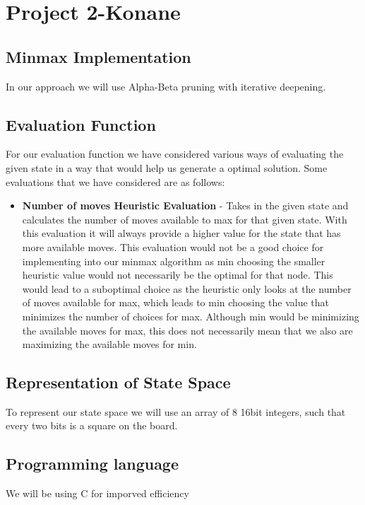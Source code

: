 \documentclass[12pt]{article}
\begin{document}
\section*{Project 2-Konane}

\subsection*{Minmax Implementation}
In our approach we will use Alpha-Beta pruning with iterative deepening.

\subsection*{Evaluation Function}
For our evaluation function we have considered various ways of evaluating the given state in a way that would help us generate a optimal solution. Some evaluations that we have considered are as follows:
\begin{itemize}
\item \textbf{Number of moves Heuristic Evaluation} - 
Takes in the given state and calculates the number of moves available to max for that given state. 
With this evaluation it will always provide a higher value for the state that has more available moves. 
This evaluation would not be a good choice for implementing into our minmax algorithm as min choosing the smaller heuristic value would not necessarily be the optimal for that node. 
This would lead to a suboptimal choice as the heuristic only looks at the number of moves available for max, which leads to min choosing the value that minimizes the number of choices for max. 
Although min would be minimizing the available moves for max, this does not necessarily mean that we also are maximizing the available moves for min.

\end{itemize}
\subsection*{Representation of State Space}
To represent our state space we will use an array of 8 16bit integers, such that every two bits is a square on the board.

\subsection*{Programming language}
We will be using C for imporved efficiency
\end{document}
